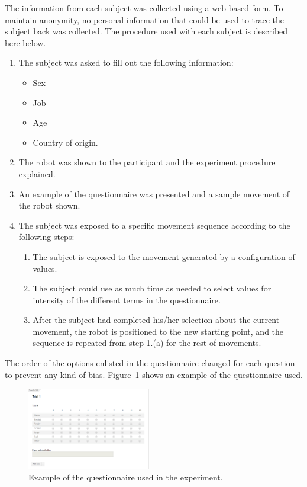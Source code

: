 
The information from each subject was collected using a web-based form. To maintain anonymity, no personal information that could be used to trace the subject back was collected. The procedure used with each subject is described here below.

\begin{enumerate}
	
	\item The subject was asked to fill out the following information:
	
	\begin{itemize}
		\item Sex
		\item Job
		\item Age
		\item Country of origin.
	\end{itemize}
	
	\item The robot was shown to the participant and the experiment procedure explained.

	\item An example of the questionnaire was presented and a sample movement of the robot shown.

	\item The subject was exposed to a specific movement sequence according to the following steps:

	\begin{enumerate}

		\item The subject is exposed to the movement generated by a configuration of values.

		\item The subject could use as much time as needed to select values for intensity of the different terms in the questionnaire.

		\item After the subject had completed his/her selection about the current movement, the robot is positioned to the new starting point, and the sequence is repeated from step 1.(a) for the rest of movements.

	\end{enumerate}
\end{enumerate}

The order of the options enlisted in the questionnaire changed for each question to prevent any kind of bias. Figure~\ref{fig:questionnaire_example} shows an example of the questionnaire used. 

\begin{figure}
	\centering
	\includegraphics[width=0.48\textwidth]{./Images/example_survey.png} 
	\caption{Example of the questionnaire used in the experiment.}
	\label{fig:questionnaire_example}
\end{figure}


